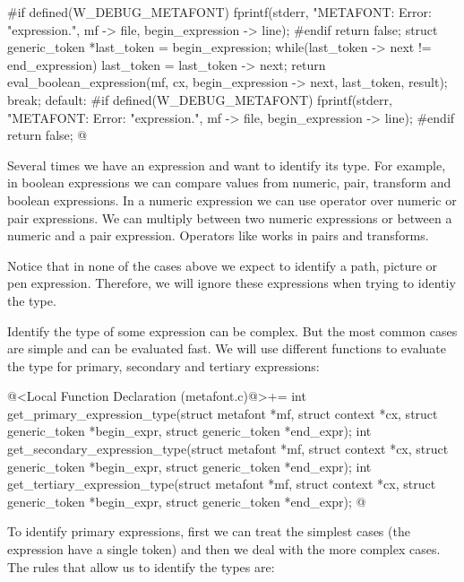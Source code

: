 {{{{{{{{#if defined(W_DEBUG_METAFONT)
      fprintf(stderr, "METAFONT: Error: %
              "expression.\n",  mf -> file, begin_expression -> line);
#endif
        return false;
      }
      struct generic_token *last_token = begin_expression;
      while(last_token -> next != end_expression)
        last_token = last_token -> next;
      return eval_boolean_expression(mf, cx, begin_expression -> next,
                                     last_token, result);
    break;
    default:
#if defined(W_DEBUG_METAFONT)
      fprintf(stderr, "METAFONT: Error: %
              "expression.\n",  mf -> file, begin_expression -> line);
#endif
    return false;
  }
}
@
\fimcodigo



Several times we have an expression and want to identify its type. For
example, in boolean expressions we can compare values from numeric,
pair, transform and boolean expressions. In a numeric expression we
can use  operator over numeric or pair
expressions. We can multiply between two numeric expressions or
between a numeric and a pair expression. Operators
like  works in pairs and transforms.

Notice that in none of the cases above we expect to identify a path,
picture or pen expression. Therefore, we will ignore these expressions
when trying to identiy the type.

Identify the type of some expression can be complex. But the most
common cases are simple and can be evaluated fast. We will use
different functions to evaluate the type for primary, secondary and
tertiary expressions:

\iniciocodigo
@<Local Function Declaration (metafont.c)@>+=
int get_primary_expression_type(struct metafont *mf, struct context *cx,
                               struct generic_token *begin_expr,
                               struct generic_token *end_expr);
int get_secondary_expression_type(struct metafont *mf, struct context *cx,
                                 struct generic_token *begin_expr,
                                 struct generic_token *end_expr);
int get_tertiary_expression_type(struct metafont *mf, struct context *cx,
                                struct generic_token *begin_expr,
                                struct generic_token *end_expr);
@
\fimcodigo

To identify primary expressions, first we can treat the simplest cases
(the expression have a single token) and then we deal with the more
complex cases. The rules that allow us to identify the types are:

}}}}}
